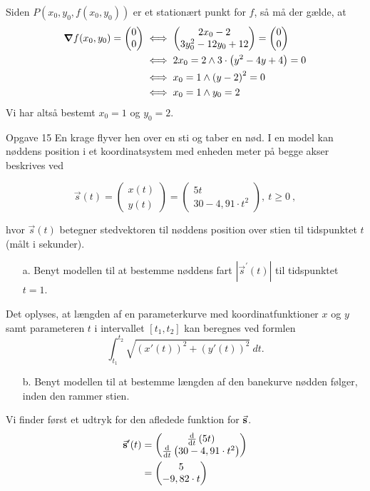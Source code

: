\documentclass{article}
\begin{document}
Siden $P(x_0,y_0,f(x_0,y_0))$ er et stationært punkt for $f$, så må der gælde, at 
\begin{equation*}
\begin{split}
  \grad f(x_0,y_0)= \mqty(0\\ 0) &\iff \mqty(2x_0-2\\ 3y_0^2-12y_0+12) = \mqty(0\\ 0) \\
  &\iff 2x_0=2 \land 3 \cdot \left(y^2-4y+4\right) =0\\
  &\iff x_0=1 \land \left(y-2\right)^2=0\\
  &\iff x_0=1 \land y_0=2
\end{split}
\end{equation*}
Vi har altså bestemt $x_0=1$ og $y_0=2$. 
\begin{question}{Opgave 15}{}
  En krage flyver hen over en sti og taber en nød. I en model kan nøddens position i et koordinatsystem med enheden meter på begge akser beskrives ved

$$\vec{s}(t)=\begin{pmatrix}x(t)\\y(t)\end{pmatrix}=\begin{pmatrix}5t\\30-4,91\cdot t^2\end{pmatrix},\:t\ge0\:,$$

hvor $\vec{s}(t)$ betegner stedvektoren til nøddens position over stien til tidspunktet $t$ (målt i sekunder).
\begin{itemize}
  \item[a.] Benyt modellen til at bestemme nøddens fart $\left|\vec{s}^{\prime}(t)\right|$ til tidspunktet $t=1.$
\end{itemize}
Det oplyses, at længden af en parameterkurve med koordinatfunktioner $x$ og $y$ samt parameteren $t$ i intervallet $[t_1,t_2]$ kan beregnes ved formlen
$$\int_{t_1}^{t_2}\sqrt{\left(x'(t)\right)^2+\left(y'(t)\right)^2}\:dt.$$
\begin{itemize}
  \item[b.] Benyt modellen til at bestemme længden af den banekurve nødden følger, inden den rammer stien.
\end{itemize}
\end{question}
Vi finder først et udtryk for den afledede funktion for $\va{s} $.
\begin{equation*}
\begin{split}
  \va{s}'(t)&=\mqty(\dv{t} \left(5t\right) \\ \dv{t} \left(30-4,91 \cdot t^2\right) ) \\
  &=\mqty(5\\ -9,82 \cdot t) 
\end{split}
\end{equation*}
\end{document}
